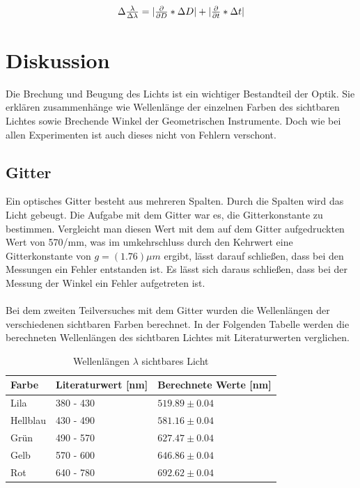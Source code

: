 \documentclass[12pt,a4paper,twoside]{article}
\begin{document}
\begin{equation}
    \label{eq:uns Auflösungsvermögen Prisma}
    \centerline{$ \Delta \frac{\lambda}{\Delta \lambda} = \vert \frac{\partial}{\partial D} * \Delta D \vert + \vert \frac{\partial}{\partial t} * \Delta t \vert$}
\end{equation}

\section{Diskussion} %
Die Brechung und Beugung des Lichts ist ein wichtiger Bestandteil der Optik. Sie erklären zusammenhänge wie Wellenlänge der einzelnen Farben des sichtbaren Lichtes sowie Brechende Winkel der Geometrischen Instrumente. 
Doch wie bei allen Experimenten ist auch dieses nicht von Fehlern verschont. 

\subsection{Gitter}
Ein optisches Gitter besteht aus mehreren Spalten. 
Durch die Spalten wird das Licht gebeugt. 
Die Aufgabe mit dem Gitter war es, die Gitterkonstante zu bestimmen. 
Vergleicht man diesen Wert mit dem auf dem Gitter aufgedruckten Wert von 570/mm, was im umkehrschluss durch den Kehrwert eine Gitterkonstante von $g=(1.76)\mu m$ ergibt, lässt darauf schließen, dass bei den Messungen ein Fehler entstanden ist. 
Es lässt sich daraus schließen, dass bei der Messung der Winkel ein Fehler aufgetreten ist. 
\\
\\
Bei dem zweiten Teilversuches mit dem Gitter wurden die Wellenlängen der verschiedenen sichtbaren Farben berechnet. 
In der Folgenden Tabelle werden die berechneten Wellenlängen des sichtbaren Lichtes mit Literaturwerten verglichen. 

\begin{table}[H]
    \centering
    \caption{Wellenlängen $\lambda$ sichtbares Licht }
    \label{tab:literatur wellenlänge}
    \begin{tabular}{| l | l | l |}
        \hline
        Farbe & Literaturwert \cite{wiki1} [nm] & Berechnete Werte [nm]\\
        \hline
        Lila        & 380 - 430 & $ 519.89 \pm 0.04 $ \\
        Hellblau    & 430 - 490 & $ 581.16 \pm 0.04 $ \\
        Grün        & 490 - 570 & $ 627.47 \pm 0.04 $ \\
        Gelb        & 570 - 600 & $ 646.86 \pm 0.04 $ \\
        Rot         & 640 - 780 & $ 692.62 \pm 0.04 $ \\
        \hline
    \end{tabular}
\end{table}
\end{document}

